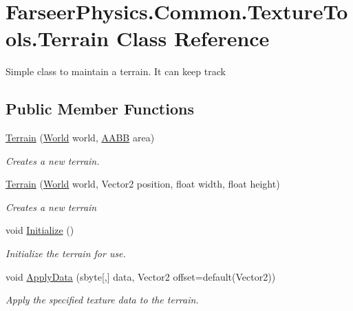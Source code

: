 \hypertarget{class_farseer_physics_1_1_common_1_1_texture_tools_1_1_terrain}{\section{Farseer\+Physics.\+Common.\+Texture\+Tools.\+Terrain Class Reference}
\label{class_farseer_physics_1_1_common_1_1_texture_tools_1_1_terrain}
}


Simple class to maintain a terrain. It can keep track  


\subsection*{Public Member Functions}
\begin{DoxyCompactItemize}
\item 
\hyperlink{class_farseer_physics_1_1_common_1_1_texture_tools_1_1_terrain_a55144851d9813e2c897011e687efb271}{Terrain} (\hyperlink{class_farseer_physics_1_1_dynamics_1_1_world}{World} world, \hyperlink{struct_farseer_physics_1_1_collision_1_1_a_a_b_b}{A\+A\+B\+B} area)
\begin{DoxyCompactList}\small\item\em Creates a new terrain. \end{DoxyCompactList}\item 
\hyperlink{class_farseer_physics_1_1_common_1_1_texture_tools_1_1_terrain_a5605dbd01105a3e3e8f2acc8cf0de4c9}{Terrain} (\hyperlink{class_farseer_physics_1_1_dynamics_1_1_world}{World} world, Vector2 position, float width, float height)
\begin{DoxyCompactList}\small\item\em Creates a new terrain \end{DoxyCompactList}\item 
void \hyperlink{class_farseer_physics_1_1_common_1_1_texture_tools_1_1_terrain_a4c0de34397c78700c9502e52be72e3c6}{Initialize} ()
\begin{DoxyCompactList}\small\item\em Initialize the terrain for use. \end{DoxyCompactList}\item 
void \hyperlink{class_farseer_physics_1_1_common_1_1_texture_tools_1_1_terrain_a78c224e6fbc0c95db009b80c235774a7}{Apply\+Data} (sbyte\mbox{[},\mbox{]} data, Vector2 offset=default(Vector2))
\begin{DoxyCompactList}\small\item\em Apply the specified texture data to the terrain. \end{DoxyCompactList}\item 

\end{DoxyCompactItemize}
